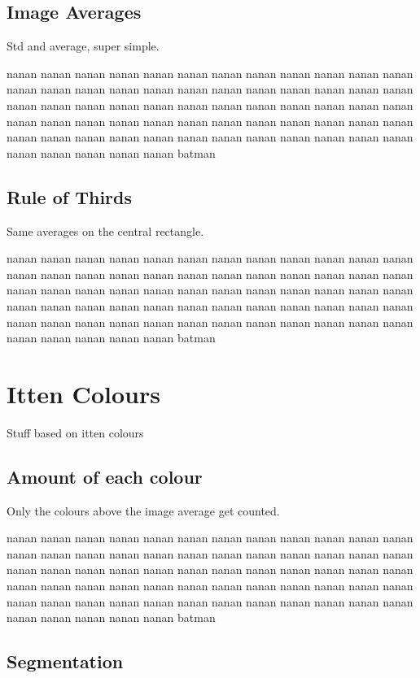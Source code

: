 \documentclass[11pt,a4paper]{report}
\begin{document}
\begin{multicols}{2}
\subsection{Image Averages}

Std and average, super simple.

nanan nanan nanan nanan nanan nanan nanan nanan nanan nanan nanan nanan nanan
nanan nanan nanan nanan nanan nanan nanan nanan nanan nanan nanan nanan nanan
nanan nanan nanan nanan nanan nanan nanan nanan nanan nanan nanan nanan nanan
nanan nanan nanan nanan nanan nanan nanan nanan nanan nanan nanan nanan nanan
nanan nanan nanan nanan nanan nanan nanan nanan nanan nanan nanan nanan nanan
batman

\subsection{Rule of Thirds}

Same averages on the central rectangle.

nanan nanan nanan nanan nanan nanan nanan nanan nanan nanan nanan nanan nanan
nanan nanan nanan nanan nanan nanan nanan nanan nanan nanan nanan nanan nanan
nanan nanan nanan nanan nanan nanan nanan nanan nanan nanan nanan nanan nanan
nanan nanan nanan nanan nanan nanan nanan nanan nanan nanan nanan nanan nanan
nanan nanan nanan nanan nanan nanan nanan nanan nanan nanan nanan nanan nanan
batman

\section{Itten Colours}

Stuff based on itten colours

\subsection{Amount of each colour}

Only the colours above the image average get counted.

nanan nanan nanan nanan nanan nanan nanan nanan nanan nanan nanan nanan nanan
nanan nanan nanan nanan nanan nanan nanan nanan nanan nanan nanan nanan nanan
nanan nanan nanan nanan nanan nanan nanan nanan nanan nanan nanan nanan nanan
nanan nanan nanan nanan nanan nanan nanan nanan nanan nanan nanan nanan nanan
nanan nanan nanan nanan nanan nanan nanan nanan nanan nanan nanan nanan nanan
batman

\subsection{Segmentation}


\end{multicols}
\end{document}
